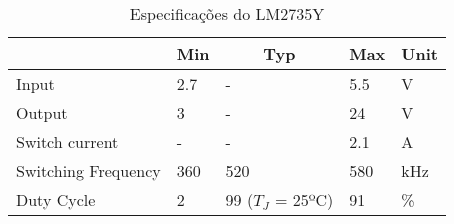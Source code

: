 \begin{table}[H]
\centering
\caption{Especificações do LM2735Y}
\label{lm2735_specs_table}
\begin{tabular}{|l|l|l|l|l|} 
\cline{2-5}
\multicolumn{1}{c|}{} & \multicolumn{1}{c|}{Min} & \multicolumn{1}{c|}{Typ} & \multicolumn{1}{c|}{Max} & Unit  \\ 
\hline
Input                 & 2.7                      & -                        & 5.5                      & V     \\ 
\hline
Output                & 3                        & -                        & 24                       & V   \\ 
\hline
Switch current                & -                        & -                        & 2.1                      & A   \\ 
\hline
Switching Frequency   & 360                        & 520                      & 580                        & kHz   \\
\hline
Duty Cycle   & 2                        & 99 ($T_{J}$ = 25ºC)                      & 91                        & \%   \\
\hline
\end{tabular}
\end{table}
